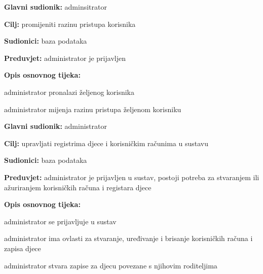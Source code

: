                     \noindent {}
					\begin{packed_item}
	
						\item \textbf{Glavni sudionik: }adminsitrator
						\item  \textbf{Cilj:} promijeniti razinu pristupa korisnika
						\item  \textbf{Sudionici:} baza podataka
						\item  \textbf{Preduvjet:} administrator je prijavljen
						\item  \textbf{Opis osnovnog tijeka:}
						
						\item[] \begin{packed_enum}
	
							\item administrator pronalazi željenog korisnika
							\item administrator mijenja razinu pristupa željenom korisniku
                        
						\end{packed_enum}
					\end{packed_item}
        
                    \noindent {}
					\begin{packed_item}
	
						\item \textbf{Glavni sudionik: }administrator
						\item  \textbf{Cilj:} upravljati registrima djece i korisničkim računima u sustavu
						\item  \textbf{Sudionici:} baza podataka
						\item  \textbf{Preduvjet:} administrator je prijavljen u sustav, postoji potreba za stvaranjem ili ažuriranjem korisničkih računa i registara djece
						\item  \textbf{Opis osnovnog tijeka:}
						
						\item[] \begin{packed_enum}
	
							\item administrator se prijavljuje u sustav
							\item administrator ima ovlasti za stvaranje, uređivanje i brisanje korisničkih računa i zapisa djece
							\item administrator stvara zapise za djecu povezane s njihovim roditeljima

						\end{packed_enum}
						
					\end{packed_item}

